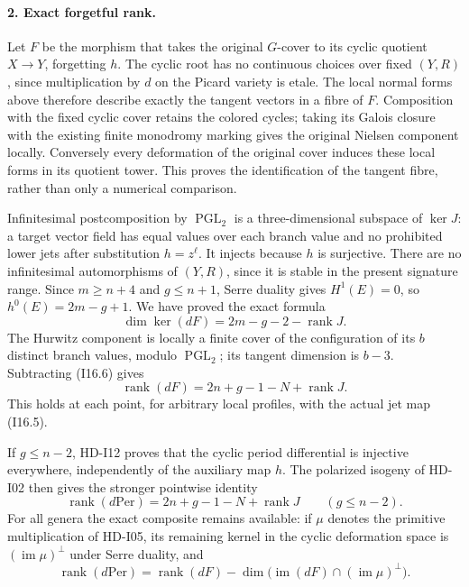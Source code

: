 \paragraph{2. Exact forgetful rank.}
Let $F$ be the morphism that takes the original $G$-cover to
its cyclic quotient $X\to Y$, forgetting $h$.  The cyclic root
has no continuous choices over fixed $(Y,R)$, since multiplication
by $d$ on the Picard variety is etale.  The local normal forms
above therefore describe exactly the tangent vectors in a fibre
of $F$.  Composition with the fixed cyclic cover retains the
colored cycles; taking its Galois closure with the existing finite
monodromy marking gives the original Nielsen component locally.
Conversely every deformation of the original cover induces these
local forms in its quotient tower.  This proves the identification
of the tangent fibre, rather than only a numerical comparison.

Infinitesimal postcomposition by $\operatorname{PGL}_2$ is a
three-dimensional subspace of $\ker J$: a target vector field has
equal values over each branch value and no prohibited lower jets
after substitution $h=z^\ell$.  It injects because $h$ is surjective.
There are no infinitesimal automorphisms of $(Y,R)$, since it is
stable in the present signature range.  Since $m\geq n+4$ and
$g\leq n+1$, Serre duality gives $H^1(E)=0$, so
$h^0(E)=2m-g+1$.  We have proved the exact formula
\begin{equation}
 \dim\ker(dF)=2m-g-2-\operatorname{rank}J.          \tag{I16.6}
\end{equation}
The Hurwitz component is locally a finite cover of the configuration
of its $b$ distinct branch values, modulo $\operatorname{PGL}_2$;
its tangent dimension is $b-3$.  Subtracting (I16.6) gives
\begin{equation}
 \boxed{\quad
 \operatorname{rank}(dF)=2n+g-1-N+\operatorname{rank}J.
 \quad}                                             \tag{I16.7}
\end{equation}
This holds at each point, for arbitrary local profiles, with the
actual jet map (I16.5).

If $g\leq n-2$, HD-I12 proves that the cyclic period differential
is injective everywhere, independently of the auxiliary map $h$.
The polarized isogeny of HD-I02 then gives the stronger pointwise
identity
\begin{equation}
 \operatorname{rank}(d\mathrm{Per})
       =2n+g-1-N+\operatorname{rank}J\qquad(g\leq n-2).
                                                       \tag{I16.8}
\end{equation}
For all genera the exact composite remains available: if $\mu$
denotes the primitive multiplication of HD-I05, its remaining
kernel in the cyclic deformation space is $(\operatorname{im}\mu)^\perp$
under Serre duality, and
\[
 \operatorname{rank}(d\mathrm{Per})
 =\operatorname{rank}(dF)
   -\dim\bigl(\operatorname{im}(dF)
                     \cap(\operatorname{im}\mu)^\perp\bigr).
\]

